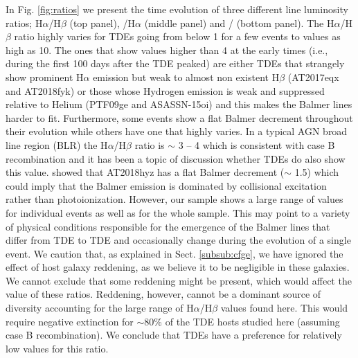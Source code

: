 \documentclass[structabstract]{aa}
\begin{document}
In Fig. \ref{fig:ratios} we present the time evolution of three different line luminosity ratios; H$\alpha$/H$\beta$ (top panel), /H$\alpha$ (middle panel) and / (bottom panel). The H$\alpha$/H$\beta$ ratio highly varies for TDEs going from below 1 for a few events to values as high as 10. The ones that show values higher than 4 at the early times (i.e., during the first 100 days after the TDE peaked) are either TDEs that strangely show prominent H$\alpha$ emission but weak to almost non existent H$\beta$ (AT2017eqx and AT2018fyk) or those whose Hydrogen emission is weak and suppressed relative
to Helium (PTF09ge and ASASSN-15oi) and this makes the Balmer lines harder to fit. Furthermore, some events show a flat Balmer decrement throughout their evolution while others have one that highly varies. In a typical AGN broad line region (BLR) the H$\alpha$/H$\beta$ ratio is $\sim$ 3 -- 4 which is consistent with case B recombination \citep{Osterbrock1974} and it has been a topic of discussion whether TDEs do also show this value. \citet{Short2020a} showed that AT2018hyz has a flat Balmer decrement ($\sim$ 1.5) which could imply that the Balmer emission is dominated by collisional excitation rather than photoionization. However, our sample shows a large range of values for individual events as well as for the whole sample. This may point to a variety of physical conditions responsible for the emergence of the Balmer lines that differ from TDE to TDE and occasionally change during the evolution of a single event. We caution that, as explained in Sect. \ref{subsub:cfge}, we have ignored the effect of host galaxy reddening, as we believe it to be negligible in these galaxies. We cannot exclude that some reddening might be present, which would affect the value of these ratios. Reddening, however, cannot be a dominant source of diversity accounting for the large range of H$\alpha$/H$\beta$ values found here. This  would require negative extinction for $\sim$80\% of the TDE hosts studied here (assuming case B recombination). We conclude that TDEs have a preference for relatively low values for this ratio.
\end{document}
